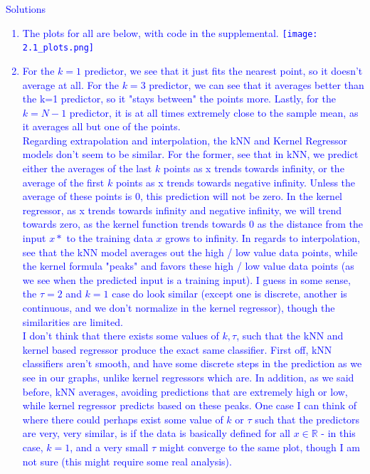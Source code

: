 \documentclass[submit]{harvardml}
\begin{document}
\newpage
\textcolor{blue}{
\begin{framed}
Solutions
\begin{enumerate}
    \item The plots for all are below, with code in the supplemental. \newline
    \texttt{[image: 2.1\_plots.png]}
    \item \textcolor{blue}{For the $k=1$ predictor, we see that it just fits the nearest point, so it doesn't average at all. For the $k=3$ predictor, we can see that it averages better than the k=1 predictor, so it "stays between" the points more. Lastly, for the $k=N-1$ predictor, it is at all times extremely close to the sample mean, as it averages all but one of the points.\newline \\  Regarding extrapolation and interpolation, the kNN and Kernel Regressor models don't seem to be similar. For the former, see that in kNN, we predict either the averages of the last $k$ points as x trends towards infinity, or the average of the first $k$ points as x trends towards negative infinity. Unless the average of these points is 0, this prediction will not be zero. In the kernel regressor, as x trends towards infinity and negative infinity, we will trend towards zero, as the kernel function trends towards 0 as the distance from the input $x*$ to the training data $x$ grows to infinity. In regards to interpolation, see that the kNN model averages out the high / low value data points, while the kernel formula "peaks" and favors these high / low value data points (as we see when the predicted input is a training input). I guess in some sense, the $\tau=2$ and $k = 1$ case do look similar (except one is discrete, another is continuous, and we don't normalize in the kernel regressor), though the similarities are limited. \newline \\ 
    I don't think that there exists some values of $k, \tau$, such that the kNN and kernel based regressor produce the exact same classifier. First off, kNN classifiers aren't smooth, and have some discrete steps in the prediction as we see in our graphs, unlike kernel regressors which are. In addition, as we said before, kNN averages, avoiding predictions that are extremely high or low, while kernel regressor predicts based on these peaks. One case I can think of where there could perhaps exist some value of $k$ or $\tau$ such that the predictors are very, very similar, is if the data is basically defined for all $x \in \mathbb{R}$ - in this case, $k = 1$, and a very small $\tau$ might converge to the same plot, though I am not sure (this might require some real analysis).}

\end{enumerate}
\end{framed}}
\end{document}
